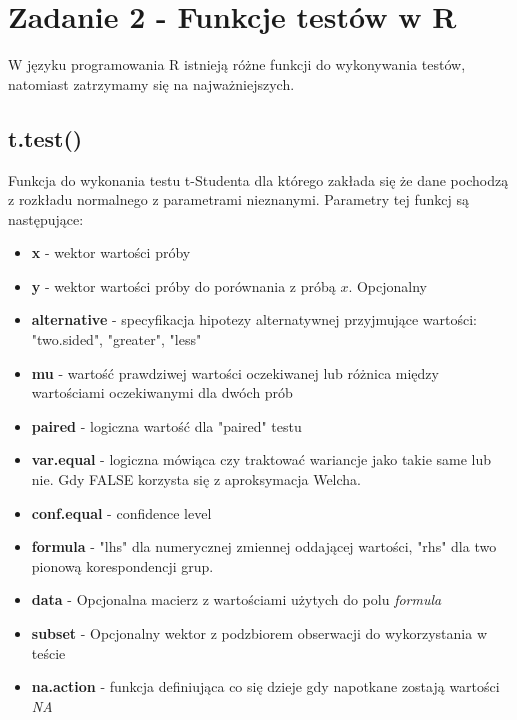 \documentclass{article}
\begin{document}
\section{Zadanie 2 - Funkcje testów w R}

W języku programowania R istnieją różne funkcji do wykonywania testów, natomiast zatrzymamy się na najważniejszych.

\subsection{t.test()}
Funkcja do wykonania testu t-Studenta dla którego zakłada się że dane pochodzą z rozkładu normalnego z parametrami nieznanymi. Parametry tej funkcj są następujące:
\begin{itemize}
\item \textbf{x} - wektor wartości próby
\item \textbf{y} - wektor wartości próby do porównania z próbą $x$. Opcjonalny
\item \textbf{alternative} - specyfikacja hipotezy alternatywnej przyjmujące wartości: "two.sided", "greater", "less"
\item \textbf{mu} - wartość prawdziwej wartości oczekiwanej lub różnica między wartościami oczekiwanymi dla dwóch prób
\item \textbf{paired} - logiczna wartość dla "paired" testu
\item \textbf{var.equal} - logiczna mówiąca czy traktować wariancje jako takie same lub nie. Gdy FALSE korzysta się z aproksymacja Welcha.
\item \textbf{conf.equal} - confidence level
\item \textbf{formula} - "lhs" dla numerycznej zmiennej oddającej wartości, "rhs" dla two pionową korespondencji grup.
\item \textbf{data} - Opcjonalna macierz z wartościami użytych do polu \textit{formula}
\item \textbf{subset}  - Opcjonalny wektor z podzbiorem obserwacji do wykorzystania w teście
\item \textbf{na.action} - funkcja definiująca co się dzieje gdy napotkane zostają wartości \textit{NA}
\end{itemize}
\end{document}

